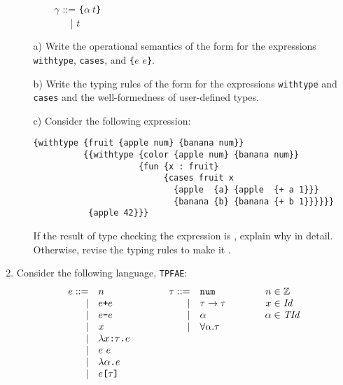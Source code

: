 \begin{enumerate}
{~~~~~~~ $\gamma$ ::= \verb+{+$\alpha\ t$\verb+}+\\
\hspace*{0em}
~~~~~~~~~~~| $t$\\
}

\begin{itemize}
  \item[a)] Write the operational semantics of the form  for the expressions
\texttt{withtype}, \texttt{cases}, and \verb+{+$e$ $e$\verb+}+.

  \item[b)] Write the typing rules of the form  for the expressions
\texttt{withtype} and \texttt{cases} and the well-formedness of user-defined types.

  \item[c)] Consider the following expression:

{
\begin{verbatim}
{withtype {fruit {apple num} {banana num}}
          {{withtype {color {apple num} {banana num}}
                     {fun {x : fruit}
                          {cases fruit x
                            {apple  {a} {apple  {+ a 1}}}
                            {banana {b} {banana {+ b 1}}}}}}
           {apple 42}}}
\end{verbatim}
}

If the result of type checking the expression is , explain why in detail.
Otherwise, revise the typing rules to make it .
\end{itemize}

\item Consider the following language, \texttt{TPFAE}:
\[
\begin{array}{rllrllr@{\hskip3pt}l}
e::= & n &\qquad& \tau::= & \code{num} &\qquad& n\in & \mathbb{Z}\\
\mid& e\verb!+!e &&\mid&\tau\rightarrow\tau && x\in & \mathit{Id}\\
\mid& e\verb!-!e &&\mid&\alpha && \alpha\in & \mathit{TId}\\
\mid& x &&\mid&\forall\alpha.\tau \\
\mid& \lambda x\verb+:+\tau\verb+.+e \\
\mid& e\ e \\
\mid& \lambda\alpha\verb+.+e \\
\mid& e\verb+[+\tau\verb+]+ \\
\end{array}
\]


\end{enumerate}
